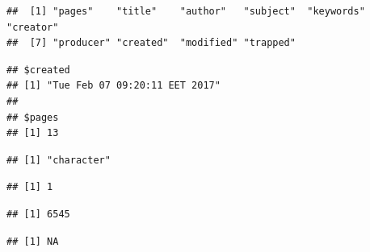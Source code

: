 \documentclass[krantz2,ChapterTOCs]{krantz}\usepackage{knitr}
\begin{document}
\begin{knitrout}\footnotesize
{}\color{fgcolor}\begin{kframe}
\begin{alltt}
 \hlkwb{<-} \hlstd{(}\hlstd{)}
\end{alltt}
\begin{verbatim}
##  [1] "pages"    "title"    "author"   "subject"  "keywords" "creator" 
##  [7] "producer" "created"  "modified" "trapped"
\end{verbatim}
\begin{alltt}
\hlstd{my.meta[}\hlstd{(}\hlstd{,} \hlstd{)]}
\end{alltt}
\begin{verbatim}
## $created
## [1] "Tue Feb 07 09:20:11 EET 2017"
## 
## $pages
## [1] 13
\end{verbatim}
\end{kframe}
\end{knitrout}

\begin{knitrout}\footnotesize
{}\color{fgcolor}\begin{kframe}
\begin{alltt}
 \hlkwb{<-} \hlstd{(}\hlstd{,}  \hlstd{=} \hlstd{)}
\end{alltt}
\begin{verbatim}
## [1] "character"
\end{verbatim}
\begin{alltt}
\end{alltt}
\begin{verbatim}
## [1] 1
\end{verbatim}
\end{kframe}
\end{knitrout}

\begin{knitrout}\footnotesize
{}\color{fgcolor}\begin{kframe}
\begin{alltt}
\hlopt{::}
\end{alltt}
\begin{verbatim}
## [1] 6545
\end{verbatim}
\begin{alltt}
\hlopt{::}\hlstd{(my.text[}\hlstd{])}
\end{alltt}
\begin{verbatim}
## [1] NA
\end{verbatim}
\end{kframe}
\end{knitrout}
\end{document}
